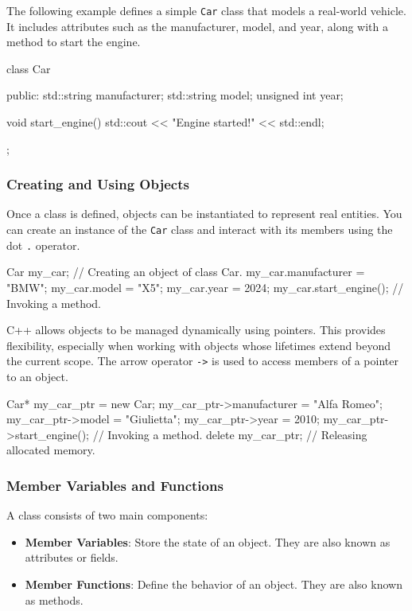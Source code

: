 The following example defines a simple \texttt{Car} class that models a real-world vehicle. It includes attributes such as the manufacturer, model, and year, along with a method to start the engine.
\begin{codeblock}[language=C++]
class Car {
public:
    std::string manufacturer;
    std::string model;
    unsigned int year;

    void start_engine() {
        std::cout << "Engine started!" << std::endl;
    }
};
\end{codeblock}

\subsubsection{Creating and Using Objects}

Once a class is defined, objects can be instantiated to represent real entities. You can create an instance of the \texttt{Car} class and interact with its members using the dot \texttt{.} operator.

\begin{codeblock}[language=C++, firstnumber=11]
Car my_car;                     // Creating an object of class Car.
my_car.manufacturer = "BMW";
my_car.model = "X5";
my_car.year = 2024;
my_car.start_engine();          // Invoking a method.
\end{codeblock}

C++ allows objects to be managed dynamically using pointers. This provides flexibility, especially when working with objects whose lifetimes extend beyond the current scope. The arrow operator \texttt{->} is used to access members of a pointer to an object.

\begin{codeblock}[language=C++, firstnumber=16]
Car* my_car_ptr = new Car{};
my_car_ptr->manufacturer = "Alfa Romeo";
my_car_ptr->model = "Giulietta";
my_car_ptr->year = 2010;
my_car_ptr->start_engine();     // Invoking a method.
delete my_car_ptr;              // Releasing allocated memory.
\end{codeblock}

\subsubsection{Member Variables and Functions}

A class consists of two main components:

\begin{itemize}
    \item \textbf{Member Variables}: Store the state of an object. They are also known as attributes or fields.
    \item \textbf{Member Functions}: Define the behavior of an object. They are also known as methods.
\end{itemize}

